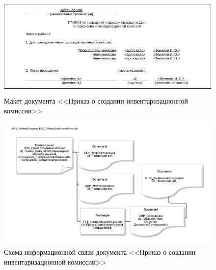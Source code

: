 
\begin{figure}[!h]
    \centering

    \includegraphics[width=17cm]
    {assets/layouts/DOC_PrilazSozdInventKomis.jpg}

    \caption{Макет документа <<Приказ о создании инвентаризационной комиссии>>}

    \label{fig:DOC_PrilazSozdInventKomis}
\end{figure}

\begin{figure}[!h]
    \centering
    \includegraphics[width=14cm]
        {assets/ARIS/ARIS_GeneralDiagram_DOC_PrikazSozdInventKomis.adf.pdf}
    \caption{Схема информационной связи документа <<Приказ о создании инвентаризационной комиссии>>}
    \label{fig:ARIS_GeneralDiagram_DOC_PrikazSozdInventKomis}
\end{figure}

